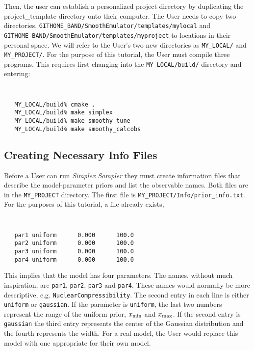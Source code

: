 \documentclass[UserManual.tex]{subfiles}
\begin{document}
Then, the user can establish a personalized project directory by duplicating the project\_template directory onto their computer. The User needs to copy two directories, {\tt GITHOME\_BAND/SmoothEmulator/templates/mylocal} and {\tt GITHOME\_BAND/SmoothEmulator/templates/myproject} to locations in their personal space. We will refer to the User's two new directories as {\tt MY\_LOCAL/} and {\tt MY\_PROJECT/}. For the purpose of this tutorial, the User must compile three programs. This requires first changing into the {\tt MY\_LOCAL/build/} directory and entering:
{\tt
\begin{verbatim}
   MY_LOCAL/build% cmake .
   MY_LOCAL/build% make simplex
   MY_LOCAL/build% make smoothy_tune
   MY_LOCAL/build% make smoothy_calcobs
\end{verbatim}
}

\subsection{Creating Necessary Info Files}
Before a User can run {\it Simplex Sampler} they must create information files that describe the model-parameter priors and list the observable names. Both files are in the {\tt MY\_PROJECT} directory. The first file is {\tt MY\_PROJECT/Info/prior\_info.txt}. For the purposes of this tutorial, a file already exists,
{\tt
\begin{verbatim}
   par1 uniform      0.000      100.0
   par2 uniform      0.000      100.0
   par3 uniform      0.000      100.0
   par4 uniform      0.000      100.0
\end{verbatim}
}
This implies that the model has four parameters. The names, without much inspiration, are {\tt par1}, {\tt par2}, {\tt par3} and {\tt par4}. These names would normally be more descriptive, e.g. {\tt NuclearCompressibility}. The second entry in each line is either {\tt uniform} or {\tt gaussian}. If the parameter is {\tt uniform}, the last two numbers represent the range of the uniform prior, $x_{\rm min}$ and $x_{\rm max}$. If the second entry is {\tt gaussian} the third entry represents the center of the Gaussian distribution and the fourth represents the width. For a real model, the User would replace this model with one appropriate for their own model.
\end{document}
